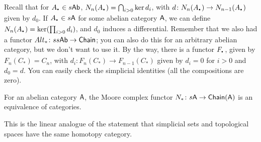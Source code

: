 Recall that for $A_\udot\in s\ab$, $N_n(A_\udot)=\bigcap_{i>0}\ker d_i$, with $d\colon N_n(A_\udot)\to N_{n-1}(A_\udot)$ given by $d_0$. If $A_\udot\in s\A$ for some abelian category $\text{\sf A}$, we can define $N_n(A_\udot)= \ker(\prod_{i>0}d_i)$, and $d_0$ induces a differential. Remember that we also had a functor $Alt_*\colon ss\text{\sf Ab}\to \text{\sf Chain}$; you can also do this for an arbitrary abelian category, but we don't want to use it. By the way, there is a functor  $F_\udot$, given by $F_n(C_*)=C_n$, with $d_i\colon F_n(C_*)\to F_{n-1}(C_*)$ given by $d_i=0$ for $i>0$ and $d_0=d$. You can easily check the simplicial identities (all the compositions are zero).
\begin{theorem}
 For an abelian category $\text{\sf A}$, the Moore complex functor $N_*\colon s\text{\sf A}\to\text{\sf Chain}(\text{\sf A})$ is an equivalence of categories.
\end{theorem}
This is the linear analogue of the statement that simplicial sets and topological spaces have the same homotopy category.
